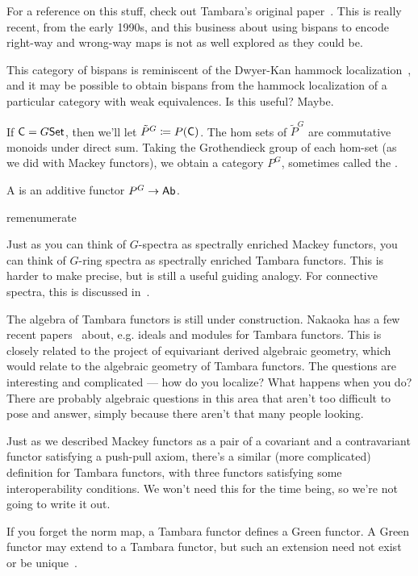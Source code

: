 For a reference on this stuff, check out Tambara's original paper~\cite{Tambara}. This is really recent, from the
early 1990s, and this business about using bispans to encode right-way and wrong-way maps is not as well explored
as they could be.
\begin{rem}
This category of bispans is reminiscent of the Dwyer-Kan hammock localization~\cite{Hammock}, and it may be
possible to obtain bispans from the hammock localization of a particular category with weak equivalences. Is this
useful? Maybe.
\end{rem}
If $\mathsf C = G\mathsf{Set}$, then we'll let $\tilde{P}^G\coloneqq P(\mathsf C)$. The hom sets of $\tilde{P}^G$ are commutative
monoids under direct sum. Taking the Grothendieck group of each hom-set (as we did with Mackey functors), we obtain
a category $P^G$, sometimes called the .
\begin{defn}
A  is an additive functor $P^G\to\mathsf{Ab}$.
\end{defn}
\begin{comp}{rem}{enumerate}
	\item Just as you can think of $G$-spectra as spectrally enriched Mackey functors, you can think of $G$-ring
	spectra as spectrally enriched Tambara functors. This is harder to make precise, but is still a useful guiding
	analogy. For connective spectra, this is discussed in~\cite{Hoyer}.
	\item The algebra of Tambara functors is still under construction. Nakaoka has a few recent
	papers~\cite{NakaokaIdeals, NakaokaFractions, NakaokaSpectrum} about, e.g. ideals and modules for Tambara
	functors. This is closely related to the project of equivariant derived algebraic geometry, which would relate
	to the algebraic geometry of Tambara functors. The questions are interesting and complicated --- how do you
	localize? What happens when you do?  There are probably algebraic questions in this area that aren't too
	difficult to pose and answer, simply because there aren't that many people looking.
	\item Just as we described Mackey functors as a pair of a covariant and a contravariant functor satisfying a
	push-pull axiom, there's a similar (more complicated) definition for Tambara functors, with three functors
	satisfying some interoperability conditions. We won't need this for the time being, so we're not going to write
	it out.
	\item If you forget the norm map, a Tambara functor defines a Green functor. A Green functor may extend to a
	Tambara functor, but such an extension need not exist or be unique~\cite{MazurThesis}.
	\qedhere
\end{comp}
